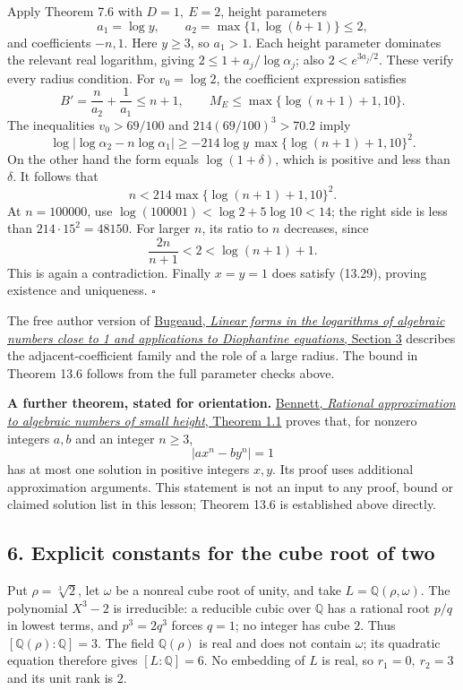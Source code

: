 \documentclass[
  11pt,
  a4paper,
]{article}
\begin{document}
Apply Theorem 7.6 with \(D=1,\ E=2\), height parameters \[
a_1=\log y,\qquad a_2=\max\{1,\log(b+1)\}\le2,
\] and coefficients \(-n,1\). Here \(y\ge3\), so \(a_1>1\). Each height
parameter dominates the relevant real logarithm, giving
\(2\le1+a_j/\log\alpha_j\); also \(2<e^{3a_j/2}\). These verify every
radius condition. For \(v_0=\log2\), the coefficient expression
satisfies \[
B'=\frac n{a_2}+\frac1{a_1}\le n+1,\qquad
M_E\le\max\{\log(n+1)+1,10\}.
\] The inequalities \(v_0>69/100\) and \(214(69/100)^3>70.2\) imply \[
\log|\log\alpha_2-n\log\alpha_1|
\ge-214\log y\,\max\{\log(n+1)+1,10\}^{2}.
\tag{13.32}
\] On the other hand the form equals \(\log(1+\delta)\), which is
positive and less than \(\delta\). It follows that \[
n<214\max\{\log(n+1)+1,10\}^{2}.
\tag{13.33}
\] At \(n=100000\), use \(\log(100001)<\log2+5\log10<14\); the right
side is less than \(214\cdot15^2=48150\). For larger \(n\), its ratio to
\(n\) decreases, since \[
\frac{2n}{n+1}<2<\log(n+1)+1.
\] This is again a contradiction. Finally \(x=y=1\) does satisfy
(13.29), proving existence and uniqueness. \(\square\)

The free author version of
\href{https://irma.math.unistra.fr/~bugeaud/travaux/ConfMumbaidef.pdf}{Bugeaud,
\emph{Linear forms in the logarithms of algebraic numbers close to 1 and
applications to Diophantine equations}, Section 3} describes the
adjacent-coefficient family and the role of a large radius. The bound in
Theorem 13.6 follows from the full parameter checks above.

\textbf{A further theorem, stated for orientation.}
\href{https://personal.math.ubc.ca/~bennett/B-Crelle2.pdf}{Bennett,
\emph{Rational approximation to algebraic numbers of small height},
Theorem 1.1} proves that, for nonzero integers \(a,b\) and an integer
\(n\ge3\), \[
|ax^n-by^n|=1
\] has at most one solution in positive integers \(x,y\). Its proof uses
additional approximation arguments. This statement is not an input to
any proof, bound or claimed solution list in this lesson; Theorem 13.6
is established above directly.

\subsection{6. Explicit constants for the cube root of
two}\label{explicit-constants-for-the-cube-root-of-two}

Put \(\rho=\sqrt[3]{2}\), let \(\omega\) be a nonreal cube root of
unity, and take \(L=\mathbb Q(\rho,\omega)\). The polynomial \(X^3-2\)
is irreducible: a reducible cubic over \(\mathbb Q\) has a rational root
\(p/q\) in lowest terms, and \(p^3=2q^3\) forces \(q=1\); no integer has
cube \(2\). Thus \([\mathbb Q(\rho):\mathbb Q]=3\). The field
\(\mathbb Q(\rho)\) is real and does not contain \(\omega\); its
quadratic equation therefore gives \([L:\mathbb Q]=6\). No embedding of
\(L\) is real, so \(r_1=0,\ r_2=3\) and its unit rank is \(2\).
\end{document}
